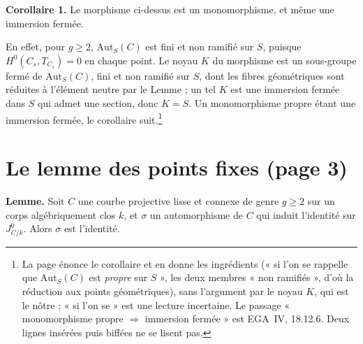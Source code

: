 \documentclass[11pt,a4paper]{article}
\begin{document}
\textbf{Corollaire 1.} Le morphisme ci-dessus est un monomorphisme, et même une
immersion fermée.

En effet, pour $g \geq 2$, $\mathrm{Aut}_{S}(C)$ est fini et non ramifié sur
$S$, puisque $H^{0}(C_{s}, T_{C_{s}}) = 0$ en chaque point. Le noyau $K$ du
morphisme est un sous-groupe fermé de $\mathrm{Aut}_{S}(C)$, fini et non
ramifié sur $S$, dont les fibres géométriques sont réduites à l'élément neutre
par le Lemme ; un tel $K$ est une immersion fermée dans $S$ qui admet une
section, donc $K = S$. Un monomorphisme propre étant une immersion fermée,
le corollaire suit.\footnote{La page énonce le corollaire et en donne les
ingrédients (« si l'on se rappelle que $\mathrm{Aut}_{S}(C)$ est
\emph{propre} sur $S$ », les deux membres « non ramifiés », d'où la réduction
aux points géométriques), sans l'argument par le noyau $K$, qui est le
nôtre ; « si l'on se » est une lecture incertaine. Le passage « monomorphisme propre $\Rightarrow$
immersion fermée » est EGA~IV, 18.12.6. Deux lignes insérées puis biffées ne se
lisent pas.}

\section*{Le lemme des points fixes (page 3)}

\textbf{Lemme.} Soit $C$ une courbe projective lisse et connexe de genre
$g \geq 2$ sur un corps algébriquement clos $k$, et $\sigma$ un automorphisme
de $C$ qui induit l'identité sur $J^{0}_{C/k}$. Alors $\sigma$ est l'identité.
\end{document}
